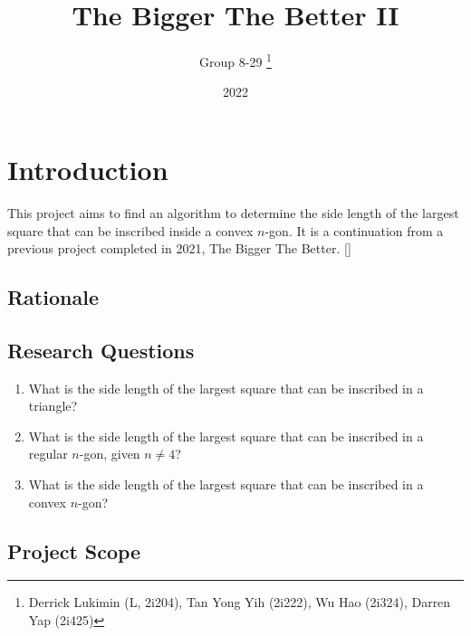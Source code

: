 \documentclass[12pt]{scrartcl}
\title{The Bigger The Better II}
\author{Group 8-29 \thanks{Derrick Lukimin (L, 2i204), Tan Yong Yih (2i222), Wu Hao (2i324), Darren Yap (2i425)}}
\date{2022}
\begin{document}
\onehalfspacing
\maketitle
\tableofcontents

\section{Introduction}
This project aims to find an algorithm to determine
the side length of the largest square that can be 
inscribed inside a convex $n$-gon. It is a continuation from
a previous project completed in 2021, The Bigger The Better. [\cite{tbtb1}]

\subsection{Rationale}

\subsection{Research Questions}
\begin{enumerate}
\item What is the side length of the largest square that can be inscribed in a triangle?
\item What is the side length of the largest square that can be inscribed in a regular $n$-gon, given $n \neq 4$?
\item What is the side length of the largest square that can be inscribed in a convex $n$-gon?
\end{enumerate}

\subsection{Project Scope}

\printbibliography
\end{document}
